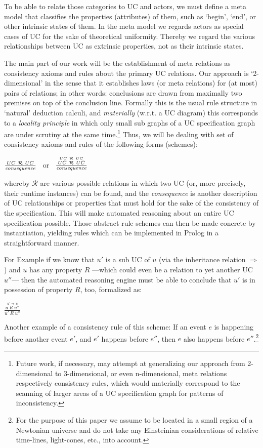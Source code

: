To be able to relate those categories to UC and actors, we must 
define a meta model that classifies the properties (attributes) 
of them, such as `begin', `end', or other intrinsic states of 
them. In the meta model we regards actors as special cases of 
UC for the sake of theoretical uniformity. Thereby we regard 
the various relationships between UC as extrinsic properties, 
not as their intrinsic states.

The main part of our work will be the establishment of meta 
relations as consistency axioms and rules about the primary 
UC relations. Our approach is `2-dimen\-sional' in the sense 
that it establishes laws (or meta relations) for (at most) 
pairs of relations; in other words: conclusions are drawn
from maximally two premises on top of the conclusion line.
Formally this is the usual rule structure in `natural' 
deduction calculi, and \emph{materially} (w.r.t. a UC diagram) 
this corresponds to a \emph{locality principle} in which only 
small sub graphs of a UC specification graph are under scrutiny 
at the same time.\footnote{Future work, 
  if necessary, may attempt at generalizing our approach 
  from 2-dimensional to 3-dimensional, or even n-dimensional, 
  meta relations respectively consistency rules, which would
  materially correspond to the scanning of larger areas of a
  UC specification graph for patterns of inconsistency.} 
Thus, we will be dealing with set of consistency axioms 
and rules of the following forms (schemes):
\begin{center}
$\frac{UC~\mathcal{R}~UC}{{\it consequence}}$ ~or
~$\frac{\stackrel{UC~\mathcal{R}~UC}{UC~\mathcal{R}~UC}}{{\it consequence}}$
\end{center}
whereby $\mathcal{R}$ are various possible relations in which 
two UC (or, more precisely, their runtime instances) can be found, 
and the {\it consequence} is another description of UC relationships 
or properties that must hold for the sake of the consistency of the 
specification. This will make automated reasoning about an entire UC 
specification possible. Those abstract rule schemes can then be made 
concrete by instantiation, yielding rules which can be implemented 
in {\sc Prolog} in a straightforward manner. 

For Example if we know that $u'$ is a sub UC of $u$ (via the inheritance 
relation $\Longrightarrow$) and $u$ has any property $R$ ---which could 
even be a relation to yet another UC $u''$--- then the automated reasoning 
engine must be able to conclude that $u'$ is in possession of property $R$, 
too, formalized as:
\begin{center}
 $\frac{\stackrel{u' \Longrightarrow u}{u~R~u''}}{u'~R~u''}$
\end{center}
Another example of a consistency rule of this scheme: If an event $e$ 
is happening before another event $e'$, and $e'$ happens before $e''$, 
then $e$ also happens before $e''$.\footnote{For the purpose of this 
	paper we assume to be located in a small region of a Newtonian universe 
	and do not take any Einsteinian considerations of relative time-lines, 
	light-cones, etc., into account.}  

